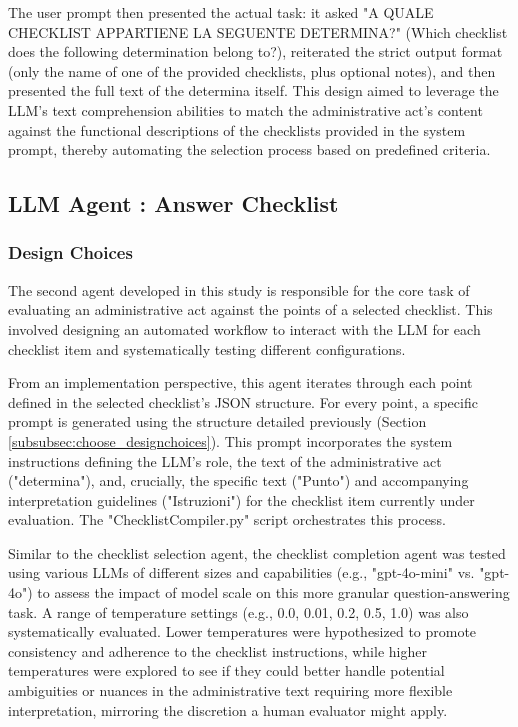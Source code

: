 \documentclass[../main.tex]{subfiles}
\begin{document}
The user prompt then presented the actual task: it asked "A QUALE CHECKLIST APPARTIENE LA SEGUENTE DETERMINA?" (Which checklist does the following determination belong to?), reiterated the strict output format (only the name of one of the provided checklists, plus optional notes), and then presented the full text of the determina itself. This design aimed to leverage the LLM's text comprehension abilities to match the administrative act's content against the functional descriptions of the checklists provided in the system prompt, thereby automating the selection process based on predefined criteria.



\subsection{LLM Agent : Answer Checklist}

\subsubsection{Design Choices}

The second agent developed in this study is responsible for the core task of evaluating an administrative act against the points of a selected checklist. This involved designing an automated workflow to interact with the LLM for each checklist item and systematically testing different configurations.

From an implementation perspective, this agent iterates through each point defined in the selected checklist's JSON structure. For every point, a specific prompt is generated using the structure detailed previously (Section \ref{subsubsec:choose_designchoices}). This prompt incorporates the system instructions defining the LLM's role, the text of the administrative act ("determina"), and, crucially, the specific text ("Punto") and accompanying interpretation guidelines ("Istruzioni") for the checklist item currently under evaluation. The "ChecklistCompiler.py" script orchestrates this process.

Similar to the checklist selection agent, the checklist completion agent was tested using various LLMs of different sizes and capabilities (e.g., "gpt-4o-mini" vs. "gpt-4o") to assess the impact of model scale on this more granular question-answering task. A range of temperature settings (e.g., 0.0, 0.01, 0.2, 0.5, 1.0) was also systematically evaluated. Lower temperatures were hypothesized to promote consistency and adherence to the checklist instructions, while higher temperatures were explored to see if they could better handle potential ambiguities or nuances in the administrative text requiring more flexible interpretation, mirroring the discretion a human evaluator might apply.
\end{document}
